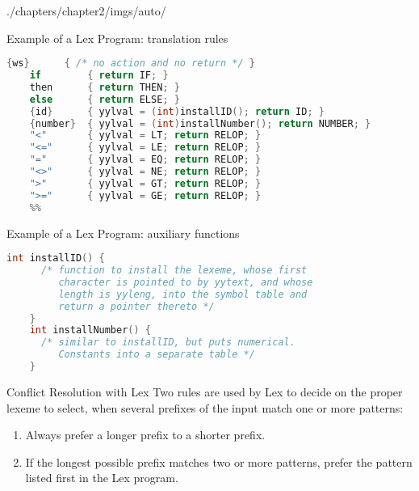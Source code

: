 \begin{graphicspathcontext}{{./chapters/chapter2/imgs/auto/}}
\begin{bibunit}[apalike]
\begin{frame}[fragile]{Example of a Lex Program: translation rules}
	\begin{lstlisting}[language=C]
	{ws}      { /* no action and no return */ }
	if        { return IF; }
	then      { return THEN; }
	else      { return ELSE; }
	{id}      { yylval = (int)installID(); return ID; }
	{number}  { yylval = (int)installNumber(); return NUMBER; }
	"<"       { yylval = LT; return RELOP; }
	"<="      { yylval = LE; return RELOP; }
	"="       { yylval = EQ; return RELOP; }
	"<>"      { yylval = NE; return RELOP; }
	">"       { yylval = GT; return RELOP; }
	">="      { yylval = GE; return RELOP; }
	%%
	\end{lstlisting}
\end{frame}

\begin{frame}[fragile]{Example of a Lex Program: auxiliary functions}
	\begin{lstlisting}[language=C]
	int installID() {
	  /* function to install the lexeme, whose first
	     character is pointed to by yytext, and whose
	     length is yyleng, into the symbol table and
	     return a pointer thereto */
	}
	int installNumber() {
	  /* similar to installID, but puts numerical.
	     Constants into a separate table */
	}
	\end{lstlisting}
\end{frame}

\begin{frame}{Conflict Resolution with Lex}
	Two rules are used by Lex to decide on the proper lexeme to select, when several prefixes of the input match one or more patterns:
	\vfill
	\begin{enumerate}
	\item Always prefer a longer prefix to a shorter prefix.
	\vfill
	\item If the longest possible prefix matches two or more patterns, prefer the pattern listed first in the Lex program.
	\end{enumerate}
\end{frame}


\end{bibunit}
\end{graphicspathcontext}
